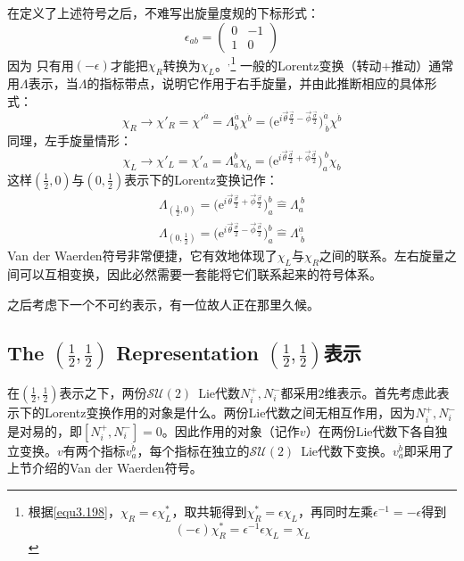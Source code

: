 在定义了上述符号之后，不难写出旋量度规的下标形式：
\begin{equation}
\label{equ3.210}
	\epsilon_{ab} =
		\begin{pmatrix}
			0 & -1 \\
			1 & 0
		\end{pmatrix}
\end{equation}
因为%
只有用$(-\epsilon)$才能把$\chi_R$转换为$\chi_L$。$^,$\footnote{根据\eqref{equ3.198}，$\chi_R=\epsilon\chi_L^*$，取共轭得到$\chi_R^*=\epsilon\chi_L$，再同时左乘$\epsilon^{-1}=-\epsilon$得到\[(-\epsilon)\chi_R^* = \epsilon^{-1}\epsilon\chi_L=\chi_L\]} 一般的Lorentz变换（转动+推动）通常用$\Lambda$表示，当$\Lambda$的指标带点，说明它作用于右手旋量，并由此推断相应的具体形式：
\begin{equation}
\label{equ3.211}
\chi_R \rightarrow \chi'_R = \chi'^{\dot{a}} = \Lambda^{\dot{a}}_{\dot{b}} \chi^{\dot{b}} = \big( \mathrm{e}^{i \vec{\theta} \frac{\vec{\sigma}}{2} - \vec{\phi} \frac{\vec{\sigma}}{2}} \big)^{\dot{a}}_{\ \dot{b}} \chi^{\dot{b}}
\end{equation}
同理，左手旋量情形：
\begin{equation}
\label{equ3.212}
	\chi_L \rightarrow \chi'_L = \chi'_a = \Lambda^b_a \chi_b = \big(  \mathrm{e}^{i \vec{\theta} \frac{\vec{\sigma}}{2} + \vec{\phi} \frac{\vec{\sigma}}{2}} \big)^{\ b}_a \chi_b
\end{equation}
这样$(\frac{1}{2}, 0)$与$(0, \frac{1}{2})$表示下的Lorentz变换记作：
\begin{align}
\label{equ3.213}
	\Lambda_{(\frac{1}{2}, 0)} = \big(  \mathrm{e}^{i \vec{\theta} \frac{\vec{\sigma}}{2} + \vec{\phi} \frac{\vec{\sigma}}{2}} \big)^b_a \hat{=} \Lambda^{\ b}_a \\
\label{equ3.214}
	\Lambda_{(0, \frac{1}{2})} = \big(  \mathrm{e}^{i \vec{\theta} \frac{\vec{\sigma}}{2} - \vec{\phi} \frac{\vec{\sigma}}{2}} \big)^b_a \hat{=} \Lambda^{\dot{a}}_{\ \dot{b}}
\end{align}
Van der Waerden符号非常便捷，它有效地体现了$\chi_L$与$\chi_R$之间的联系。左右旋量之间可以互相变换，因此必然需要一套能将它们联系起来的符号体系。

之后考虑下一个不可约表示，有一位故人正在那里久候。

\subsection[$(\frac{1}{2}, \frac{1}{2})$表示]{ The $( \frac{1}{2}, \frac{1}{2})$ Representation \quad $(\frac{1}{2}, \frac{1}{2})$表示}
\label{sec3.7.8}
在$(\frac{1}{2},  \frac{1}{2})$表示之下，两份$\mathcal{SU}(2)$\ Lie代数$N_i^+, N_i^-$都采用$2$维表示。首先考虑此表示下的Lorentz变换作用的对象是什么。两份Lie代数之间无相互作用，因为$N_i^+, N_i^-$是对易的，即$[N_i^+, N_i^-] = 0$。因此作用的对象（记作$v$）在两份Lie代数下各自独立变换。$v$有两个指标$v_a^{\dot{b}}$，每个指标在独立的$\mathcal{SU}(2)$\ Lie代数下变换。$v_a^{\dot{b}}$即采用了上节介绍的Van der Waerden符号。

